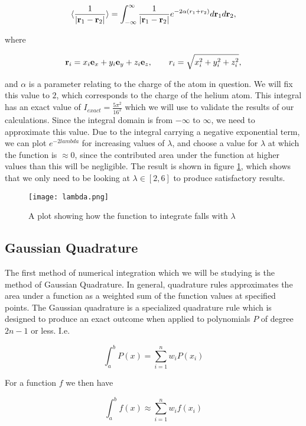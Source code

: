\documentclass[a4paper,10pt,english]{article}
\begin{document}
\begin{equation} \label{eq:int_cart}
    \langle \frac{1}{|\bold{r}_1 - \bold{r}_2|} \rangle = \int_{-\infty}^\infty \frac{1}{|\bold{r}_1 - \bold{r}_2|} e^{-2\alpha (r_1 + r_2)} d\bold{r}_1 d\bold{r}_2,
\end{equation}

where

$$\bold{r}_i = x_i \bold{e}_x + y_i \bold{e}_y + z_i \bold{e}_z, \qquad r_i =  \sqrt{x_i^2 + y_i^2 + z_i^2},$$

and $\alpha$ is a parameter relating to the charge of the atom in question. We will fix this value to $2$, which corresponds to the charge of the helium atom. This integral has an exact value of $I_{exact} = \frac{5 \pi^2}{16^2}$ which we will use to validate the results of our calculations. Since the integral domain is from $-\infty$ to $\infty$, we need to approximate this value. Due to the integral carrying a negative exponential term, we can plot $e^{-2lambda}$ for increasing values of $\lambda$, and choose a value for $\lambda$ at which the function is $\approx 0$, since the contributed area under the function at higher values than this will be negligible. The result is shown in figure \ref{fig:lambda}, which shows that we only need to be looking at $\lambda \in [2, 6]$ to produce satisfactory results.

\begin{figure}
    \centering
    \texttt{[image: lambda.png]}
    \caption{A plot showing how the function to integrate falls with $\lambda$}
    \label{fig:lambda}
\end{figure}

\subsection{Gaussian Quadrature}

The first method of numerical integration which we will be studying is the method of Gaussian Quadrature. In general, quadrature rules approximates the area under a function as a weighted sum of the function values at specified points. The Gaussian quadrature is a specialized quadrature rule which is designed to produce an exact outcome when applied to polynomials $P$ of degree $2n - 1$ or less. I.e.

$$ \int_a^b P(x) = \sum_{i=1}^n w_i P(x_i)$$

For a function $f$ we then have

$$\int_a^b f(x) \approx \sum_{i=1}^n w_i f(x_i)$$
\end{document}

